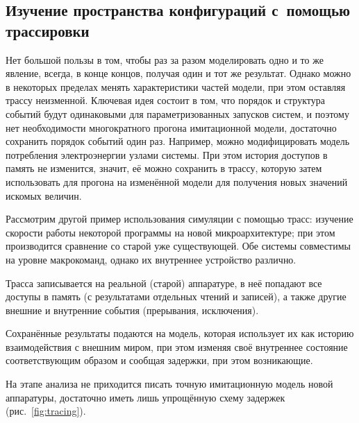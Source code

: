 \subsection[Изучение пространства конфигураций]{Изучение пространства конфигураций с~помощью трассировки}

Нет большой пользы в том, чтобы раз за разом моделировать одно и то же явление, всегда, в конце концов, получая один и тот же результат. Однако можно в некоторых пределах менять характеристики частей модели, при этом оставляя трассу неизменной. Ключевая идея состоит в том, что порядок и структура событий будут одинаковыми для параметризованных запусков систем, и поэтому нет необходимости многократного прогона имитационной модели, достаточно сохранить порядок событий один раз. Например, можно модифицировать модель потребления электроэнергии узлами системы. При этом история доступов в память не изменится, значит, её можно сохранить в трассу, которую затем использовать для прогона на изменённой модели для получения новых значений искомых величин.

Рассмотрим другой пример использования  симуляции с помощью трасс: изучение скорости работы некоторой программы на новой микроархитектуре; при этом производится сравнение со старой уже существующей. Обе системы совместимы на уровне макрокоманд, однако их внутреннее устройство различно. 

\begin{enumerate*}
    \item Трасса записывается на реальной (старой) аппаратуре, в неё попадают все доступы в память (с результатами отдельных чтений и записей), а также другие внешние и внутренние события (прерывания, исключения). 
    \item Сохранённые результаты подаются на модель, которая использует их как историю взаимодействия с внешним миром, при этом изменяя своё внутреннее состояние соответствующим образом и сообщая задержки, при этом возникающие. 
    \item На этапе анализа не приходится писать точную имитационную модель новой аппаратуры, достаточно иметь лишь упрощённую схему задержек (рис.~\ref{fig:tracing}).
\end{enumerate*}

